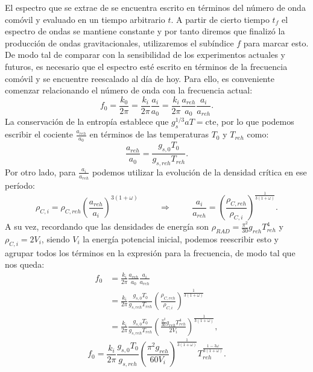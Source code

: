 El espectro que se extrae de \CosmoLattice se encuentra escrito en términos del número de onda comóvil y evaluado en un tiempo arbitrario $t$. A partir de cierto tiempo $t_f$ el espectro de ondas se mantiene constante y por tanto diremos que finalizó la producción de ondas gravitacionales, utilizaremos el subíndice $f$ para marcar esto. De modo tal de comparar con la sensibilidad de los experimentos actuales y futuros, es necesario que el espectro esté escrito en términos de la frecuencia comóvil y se encuentre reescalado al día de hoy. Para ello, es conveniente comenzar relacionando el número de onda con la frecuencia actual:
\begin{equation}
    f_0 = \frac{k_0}{2 \pi} = \frac{k_i}{2 \pi} \frac{a_i}{a_0} = \frac{k_i}{2 \pi} \frac{a_{reh}}{a_{0}} \frac{a_i}{a_{reh}}.
\end{equation}
La conservación de la entropía establece que $g^{1/3}_s a T = \text{cte}$, por lo que podemos escribir el cociente $\displaystyle \frac{a_{reh}}{a_0}$ en términos de las temperaturas $T_0$ y $T_{reh}$ como:
\begin{equation}
    \frac{a_{reh}}{a_0} = \frac{g_{s,0} T_0}{g_{s,reh} T_{reh}}.
\end{equation}
Por otro lado, para $\displaystyle \frac{a_i}{a_{reh}}$ podemos utilizar la evolución de la densidad crítica en ese período:
\begin{equation}
    \rho_{C,i} = \rho_{C,reh} \left( \frac{a_{reh}}{a_i} \right)^{3(1 + \omega)} \hspace{1cm} \Longrightarrow \hspace{1cm} \frac{a_{i}}{a_{reh}} = \left( \frac{\rho_{C,reh}}{\rho_{C,i}} \right)^{\frac{1}{3(1 + \omega)}}.
\end{equation}
A su vez, recordando que las densidades de energía son $\displaystyle \rho_{RAD} = \frac{\pi^2}{30} g_{reh} T_{reh}^4$ y $\rho_{C,i} = 2 V_i$, siendo $V_i$ la energía potencial inicial, podemos reescribir esto y agrupar todos los términos en la expresión para la frecuencia, de modo tal que nos queda:
\begin{equation*}
    \begin{split}
        f_0 &= \frac{k_i}{2 \pi} \frac{a_{reh}}{a_{0}} \frac{a_i}{a_{reh}} \\
        &= \frac{k_i}{2 \pi} \frac{g_{s,0} T_0}{g_{s,reh} T_{reh}} \left( \frac{\rho_{C,reh}}{\rho_{C,i}} \right)^{\frac{1}{3(1 + \omega)}} \\
        &= \frac{k_i}{2 \pi} \frac{g_{s,0} T_0}{g_{s,reh} T_{reh}} \left( \frac{\frac{\pi^2}{30} g_{reh} T^4_{reh}}{2V_{i}} \right)^{\frac{1}{3(1 + \omega)}},
    \end{split}
\end{equation*}
\begin{equation}\label{eqn:reescaleo_f}
    f_0 = \frac{k_i}{2 \pi} \frac{g_{s,0} T_0}{g_{s,reh}} \left( \frac{\pi^2 g_{reh}}{60 V_{i}} \right)^{\frac{1}{3(1 + \omega)}} T^{\frac{1 - 3 \omega}{3 (1 + \omega)}}_{reh}.
\end{equation}

